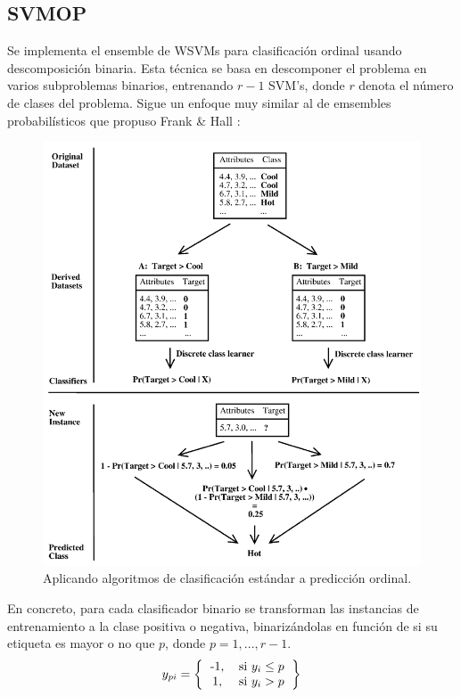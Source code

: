\subsection{SVMOP}
Se implementa el ensemble de WSVMs para clasificación ordinal \cite{waegeman2009ensemble} usando descomposición binaria.
Esta técnica se basa en descomponer el problema en varios subproblemas binarios, entrenando $r-1$ SVM's, donde $r$ denota el número de clases del problema. 
Sigue un enfoque muy similar al de emsembles probabilísticos que propuso Frank \& Hall \cite{frank2001simple}:


\begin{figure}[H]
	\centering
	\includegraphics[scale=0.4]{figures/Frankhall}
	\caption[Short figure name.]{Aplicando algoritmos de clasificación estándar a predicción ordinal.
		\label{fig:myInlineFigure}}
\end{figure}



En concreto, para cada clasificador binario se transforman las instancias de entrenamiento a la clase positiva o negativa, binarizándolas en función de si su etiqueta es mayor o no que $p$, donde $p=1,...,r-1$. \newline
\[ 
y_{pi}=
\left \{
\begin{tabular}{cc}
-1, & si $y_i \leq p$ \\
1, & si $y_i > p$  
\end{tabular}
\right \}
\]

